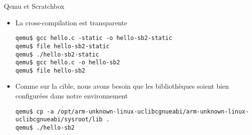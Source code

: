 \begin{frame}[fragile=singleslide]{Qemu et Scratchbox}
  \begin{itemize} 
  \item La cross-compilation est transparente
    \begin{lstlisting} 
qemu$ gcc hello.c -static -o hello-sb2-static
qemu$ file hello-sb2-static
qemu$ ./hello-sb2-static
qemu$ gcc hello.c -o hello-sb2
qemu$ file hello-sb2
    \end{lstlisting}
  \item Comme  sur la cible,  nous avons besoin que  les bibliothèques
    soient bien configurées dans notre environnement
    \begin{lstlisting} 
qemu$ cp -a /opt/arm-unknown-linux-uclibcgnueabi/arm-unknown-linux-uclibcgnueabi/sysroot/lib .
qemu$ ./hello-sb2
    \end{lstlisting} 
  \end{itemize} 
\end{frame}




